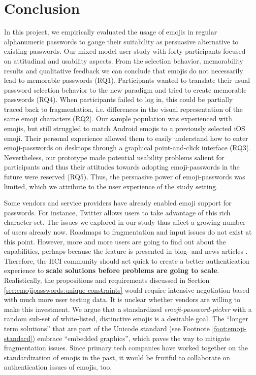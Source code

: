 \section{Conclusion}
In this project, we empirically evaluated the usage of emojis in regular alphanumeric passwords to gauge their suitability as persuasive alternative to existing passwords. Our mixed-model user study with forty participants focused on attitudinal and usability aspects. From the selection behavior, memorability results and qualitative feedback we can conclude that emojis do not necessarily lead to memorable passwords (RQ1). Participants wanted to translate their usual password selection behavior to the new paradigm and tried to create memorable passwords (RQ4). When participants failed to log in, this could be partially traced back to fragmentation, i.e. differences in the visual representation of the same emoji characters (RQ2). Our sample population was experienced with emojis, but still struggled to match Android emojis to a previously selected iOS emoji. Their personal experience allowed them to easily understand how to enter emoji-passwords on desktops through a graphical point-and-click interface (RQ3). Nevertheless, our prototype made potential usability problems salient for participants and thus their attitudes towards adopting emoji-passwords in the future were reserved (RQ5). Thus, the persuasive power of emoji-passwords was limited, which we attribute to the user experience of the study setting. 

Some vendors and service providers have already enabled emoji support for passwords. For instance, Twitter allows users to take advantage of this rich character set. The issues we explored in our study thus affect a growing number of users already now. Roadmaps to fragmentation and input issues do not exist at this point. However, more and more users are going to find out about the capabilities, perhaps because the feature is presented in blog- and news articles \cite{Dashinsky2015NoEmojisInPWs}. Therefore, the HCI community should act quick to create a better authentication experience to \textbf{scale solutions before problems are going to scale}. 
Realistically, the propositions and requirements discussed in Section \ref{sec:emojipasswords:unique-constraints} would require intensive negotiation based with much more user testing data.  It is unclear whether vendors are willing to make this investment. We argue that a standardized \textit{emoji-password-picker} with a random sub-set of white-listed, distinctive emojis is a desirable goal. The ``longer term solutions'' that are part of the Unicode standard (see Footnote \ref{foot:emoji-standard}) embrace ``embedded graphics'', which paves the way to mitigate fragmentation issues. Since primary tech companies have worked together on the standardization of emojis in the past, it would be fruitful to collaborate on authentication issues of emojis, too.

